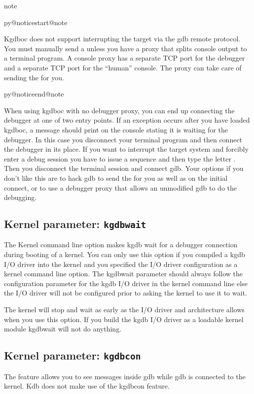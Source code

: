 \documentclass[a4paper,8pt,english]{sphinxmanual}
\makeatletter
\renewenvironment{notice}[2]{%
          \def\py@noticetype{#1}
          \begin{coloredbox}{#1}
          \bf\it
          \par\strong{#2}
          \csname py@noticestart@#1\endcsname
        }
	{
          \csname py@noticeend@\py@noticetype\endcsname
          \end{coloredbox}
        }
\makeatother
\begin{document}
\begin{notice}{note}{Note:}
Kgdboc does not support interrupting the target via the gdb remote
protocol. You must manually send a  unless you have a proxy
that splits console output to a terminal program. A console proxy has a
separate TCP port for the debugger and a separate TCP port for the
``human'' console. The proxy can take care of sending the 
for you.
\end{notice}

When using kgdboc with no debugger proxy, you can end up connecting the
debugger at one of two entry points. If an exception occurs after you
have loaded kgdboc, a message should print on the console stating it is
waiting for the debugger. In this case you disconnect your terminal
program and then connect the debugger in its place. If you want to
interrupt the target system and forcibly enter a debug session you have
to issue a  sequence and then type the letter . Then you
disconnect the terminal session and connect gdb. Your options if you
don't like this are to hack gdb to send the  for you as well as
on the initial connect, or to use a debugger proxy that allows an
unmodified gdb to do the debugging.


\subsection{Kernel parameter: \texttt{kgdbwait}}
\label{dev-tools/kgdb:kernel-parameter-kgdbwait}
The Kernel command line option  makes kgdb wait for a
debugger connection during booting of a kernel. You can only use this
option if you compiled a kgdb I/O driver into the kernel and you
specified the I/O driver configuration as a kernel command line option.
The kgdbwait parameter should always follow the configuration parameter
for the kgdb I/O driver in the kernel command line else the I/O driver
will not be configured prior to asking the kernel to use it to wait.

The kernel will stop and wait as early as the I/O driver and
architecture allows when you use this option. If you build the kgdb I/O
driver as a loadable kernel module kgdbwait will not do anything.


\subsection{Kernel parameter: \texttt{kgdbcon}}
\label{dev-tools/kgdb:kernel-parameter-kgdbcon}
The  feature allows you to see  messages inside gdb
while gdb is connected to the kernel. Kdb does not make use of the kgdbcon
feature.
\end{document}
